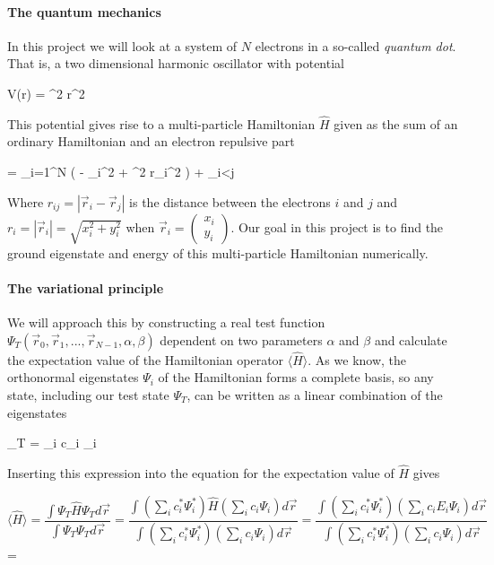 \paragraph{The quantum mechanics}

In this project we will look at a system of $N$ electrons in a so-called \textit{quantum dot}.
That is, a two dimensional harmonic oscillator with potential 

\eqs
V(\vec r) =  \omega^2 r^2
\label{eq:harmonic_oscillator_potential}
\eqf

This potential gives rise to a multi-particle Hamiltonian $\hat{H}$ given as the sum of an ordinary Hamiltonian and an electron repulsive part

\eqs
{} = \sum_{i=1}^N \left ( - \nabla_i^2 +  \omega^2 r_i^2 \right ) + \sum_{i<j}  
\label{eq:harmonic_oscillator_hamiltonian}
\eqf

Where $r_{ij} = |\vec r_i - \vec r_j| $ is the distance between the electrons $i$ and $j$ and $r_i = |\vec r_i | = \sqrt{x_i^2 + y_i^2}$ when $\vec r_i = \left ( \begin{matrix} x_i \\ y_i \end{matrix} \right ) $. 
Our goal in this project is to find the ground eigenstate and energy of this multi-particle Hamiltonian numerically. 

\paragraph{The variational principle}\label{sec:variational_principle}

We will approach this by constructing a real test function $\Psi_T(\vec r_0, \vec r_1, ... , \vec r_{N-1}, \alpha,\beta )$ dependent on two parameters $\alpha$ and $\beta$ and calculate the expectation value of the Hamiltonian operator $\langle \hat{H} \rangle $. 
As we know, the orthonormal eigenstates $\Psi_i$ of the Hamiltonian forms a complete basis, so any state, including our test state $\Psi_T$, can be written as a linear combination of the eigenstates 

\eqs
\Psi_T = \sum_i c_i \Psi_i
\eqf

Inserting this expression into the equation for the expectation value of $\hat{H}$ gives

\[
\langle \hat{H} \rangle = \frac{\int \Psi_T \hat{H} \Psi_T d\vec r}{ \int \Psi_T \Psi_T d\vec r} 
= \frac{\int \left ( \sum_i c_i^* \Psi_i^* \right ) \hat{H} \left ( \sum_i c_i \Psi_i \right ) d\vec r}{ \int \left ( \sum_i c_i^* \Psi_i^*  \right ) \left ( \sum_i c_i \Psi_i \right ) d\vec r}
=
\frac{\int \left ( \sum_i c_i^* \Psi_i^* \right ) \left ( \sum_i c_i  E_i \Psi_i \right ) d\vec r}{ \int \left ( \sum_i c_i^* \Psi_i^* \right ) \left ( \sum_i c_i \Psi_i \right ) d\vec r}
\]
\eqs
=
\eqf

